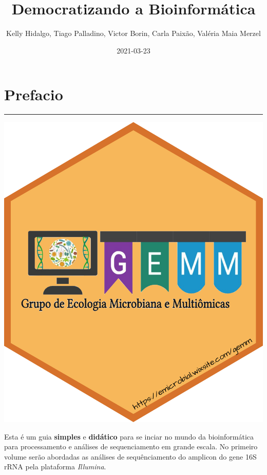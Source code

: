 \documentclass[
]{book}
\title{ Democratizando a Bioinformática}
\author{Kelly Hidalgo, Tiago Palladino, Victor Borin, Carla Paixão, Valéria Maia Merzel}
\date{2021-03-23}
\begin{document}
\maketitle

{
\setcounter{tocdepth}{1}
\tableofcontents
}
\hypertarget{prefacio}{%
\chapter*{Prefacio}\label{prefacio}}

\begin{center}\rule{0.5\linewidth}{0.5pt}\end{center}

\begin{center}\includegraphics[width=1.2\linewidth,height=1.2\textheight]{imgs/1} \end{center}

Esta é um guia \textbf{simples} e \textbf{didático} para se inciar no mundo da bioinformática para processamento e análises de sequenciamento em grande escala. No primeiro volume serão abordadas as análises de sequênciamento do amplicon do gene 16S rRNA pela plataforma \emph{Illumina}.
\end{document}
